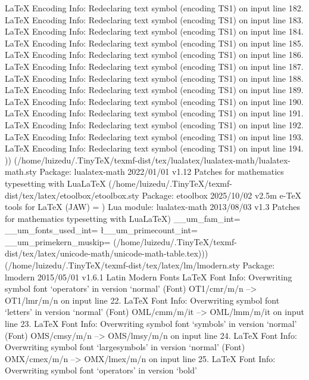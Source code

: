 LaTeX Encoding Info:    Redeclaring text symbol \textmu (encoding TS1) on input line 182.
LaTeX Encoding Info:    Redeclaring text symbol \textparagraph (encoding TS1) on input line 183.
LaTeX Encoding Info:    Redeclaring text symbol \textperiodcentered (encoding TS1) on input line 184.
LaTeX Encoding Info:    Redeclaring text symbol \textreferencemark (encoding TS1) on input line 185.
LaTeX Encoding Info:    Redeclaring text symbol \textonesuperior (encoding TS1) on input line 186.
LaTeX Encoding Info:    Redeclaring text symbol \textordmasculine (encoding TS1) on input line 187.
LaTeX Encoding Info:    Redeclaring text symbol \textsurd (encoding TS1) on input line 188.
LaTeX Encoding Info:    Redeclaring text symbol \textonequarter (encoding TS1) on input line 189.
LaTeX Encoding Info:    Redeclaring text symbol \textonehalf (encoding TS1) on input line 190.
LaTeX Encoding Info:    Redeclaring text symbol \textthreequarters (encoding TS1) on input line 191.
LaTeX Encoding Info:    Redeclaring text symbol \texteuro (encoding TS1) on input line 192.
LaTeX Encoding Info:    Redeclaring text symbol \texttimes (encoding TS1) on input line 193.
LaTeX Encoding Info:    Redeclaring text symbol \textdiv (encoding TS1) on input line 194.
)) (/home/luizedu/.TinyTeX/texmf-dist/tex/lualatex/lualatex-math/lualatex-math.sty
Package: lualatex-math 2022/01/01 v1.12 Patches for mathematics typesetting with LuaLaTeX
(/home/luizedu/.TinyTeX/texmf-dist/tex/latex/etoolbox/etoolbox.sty
Package: etoolbox 2025/10/02 v2.5m e-TeX tools for LaTeX (JAW)
\etb@tempcnta=
)
Lua module: lualatex-math 2013/08/03 v1.3 Patches for mathematics typesetting with LuaLaTeX)
\g__um_fam_int=
\g__um_fonts_used_int=
\l__um_primecount_int=
\g__um_primekern_muskip=
(/home/luizedu/.TinyTeX/texmf-dist/tex/latex/unicode-math/unicode-math-table.tex))) (/home/luizedu/.TinyTeX/texmf-dist/tex/latex/lm/lmodern.sty
Package: lmodern 2015/05/01 v1.6.1 Latin Modern Fonts
LaTeX Font Info:    Overwriting symbol font `operators' in version `normal'
(Font)                  OT1/cmr/m/n --> OT1/lmr/m/n on input line 22.
LaTeX Font Info:    Overwriting symbol font `letters' in version `normal'
(Font)                  OML/cmm/m/it --> OML/lmm/m/it on input line 23.
LaTeX Font Info:    Overwriting symbol font `symbols' in version `normal'
(Font)                  OMS/cmsy/m/n --> OMS/lmsy/m/n on input line 24.
LaTeX Font Info:    Overwriting symbol font `largesymbols' in version `normal'
(Font)                  OMX/cmex/m/n --> OMX/lmex/m/n on input line 25.
LaTeX Font Info:    Overwriting symbol font `operators' in version `bold'
